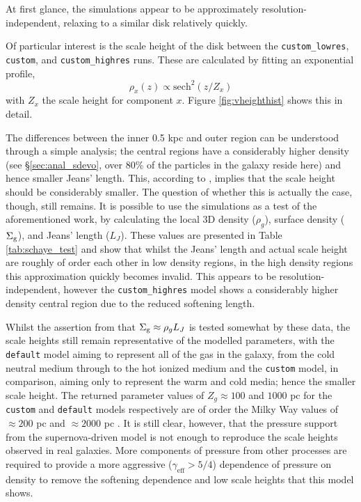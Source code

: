 At first glance, the simulations appear to be approximately resolution-independent, relaxing to a similar disk relatively quickly.

Of particular interest is the scale height of the disk between the {\tt custom\_lowres}, {\tt custom}, and {\tt custom\_highres} runs.
These are calculated by fitting an exponential profile,
\begin{equation}
    \rho_x(z) \propto \mathrm{sech}^2\left(z/Z_x\right)
    \label{eqn:vertprofile}
\end{equation}
with $Z_x$ the scale height for component $x$. Figure \ref{fig:vheighthist} shows this in detail.

The differences between the inner 0.5 kpc and outer region can be understood through a simple \citet{jeans_stability_1902} analysis; the central regions have a considerably higher density (see \S \ref{sec:anal_sdevo}, over 80\% of the particles in the galaxy reside here) and hence smaller Jeans' length.
This, according to \citet{schaye_model-independent_2001}, implies that the scale height should be considerably smaller.
The question of whether this is actually the case, though, still remains.
It is possible to use the simulations as a test of the aforementioned work, by calculating the local 3D density ($\rho_g$), surface density ($\Sigma_\mathrm{g}$), and Jeans' length ($L_J$).
These values are presented in Table \ref{tab:schaye_test} and show that whilst the Jeans' length and actual scale height are roughly of order each other in low density regions, in the high density regions this approximation quickly becomes invalid.
This appears to be resolution-independent, however the {\tt custom\_highres} model shows a considerably higher density central region due to the reduced softening length.

Whilst the assertion from \citet{schaye_model-independent_2001} that $\Sigma_\mathrm{g} \approx \rho_g L_J$ is tested somewhat by these data, the scale heights still remain representative of the modelled parameters, with the {\tt default} model aiming to represent all of the gas in the galaxy, from the cold neutral medium through to the hot ionized medium and the {\tt custom} model, in comparison, aiming only to represent the warm and cold media; hence the smaller scale height.
The returned parameter values of $Z_g \approx 100$ and $1000$ pc for the {\tt custom} and {\tt default} models respectively are of order the Milky Way values of $\approx 200$ pc and $\approx 2000$ pc \citep{mckee_stars_2015}.
It is still clear, however, that the pressure support from the supernova-driven model is not enough to reproduce the scale heights observed in real galaxies.
More components of pressure from other processes are required to provide a more aggressive ($\gamma_\mathrm{eff} > 5/4$) dependence of pressure on density to remove the softening dependence and low scale heights that this model shows.


